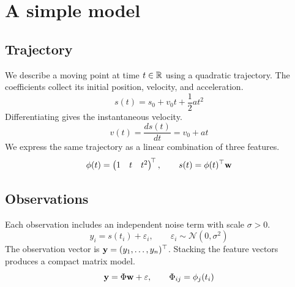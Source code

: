 \section{A simple model}
\subsection{Trajectory}
We describe a moving point at time $t \in \mathbb{R}$ using a quadratic trajectory.
The coefficients collect its initial position, velocity, and acceleration.
\begin{equation}
  s(t) = s_0 + v_0 t + \frac{1}{2} a t^2
  \label{eq:trajectory}
\end{equation}
Differentiating gives the instantaneous velocity.
\begin{equation}
  v(t) = \frac{d s(t)}{d t} = v_0 + a t
  \label{eq:velocity}
\end{equation}
We express the same trajectory as a linear combination of three features.
\begin{equation}
  \mathbf{\phi}(t) = \begin{pmatrix}1 & t & t^2\end{pmatrix}^{\!\top},
  \qquad s(t) = \mathbf{\phi}(t)^\top \mathbf{w}
  \label{eq:feature_map}
\end{equation}
\subsection{Observations}
Each observation includes an independent noise term with scale $\sigma > 0$.
\begin{equation}
  y_i = s(t_i) + \varepsilon_i,
  \qquad \varepsilon_i \sim \mathcal{N}(0,\sigma^2)
  \label{eq:observations}
\end{equation}
The observation vector is $\mathbf{y}=(y_1,\ldots,y_n)^\top$.
Stacking the feature vectors produces a compact matrix model.
\begin{equation}
  \mathbf{y} = \Phi\mathbf{w} + \mathbf{\varepsilon},
  \qquad \Phi_{ij} = \phi_j(t_i)
  \label{eq:matrix_model}
\end{equation}
